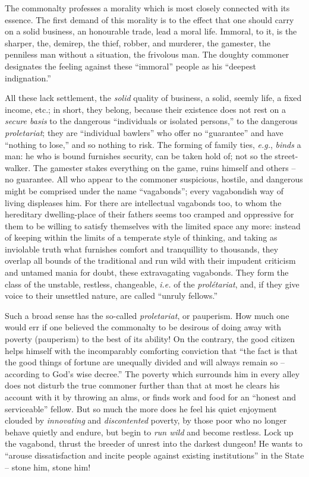 The commonalty professes a morality which is most closely connected with its 
essence. The first demand of this morality is to the effect that one should 
carry on a solid business, an honourable trade, lead a moral life. Immoral, to 
it, is the sharper, the, demirep, the thief, robber, and murderer, the 
gamester, the penniless man without a situation, the frivolous man. The 
doughty commoner designates the feeling against these ``immoral'' people as 
his ``deepest indignation.''

All these lack settlement, the \textit{solid} quality of business, a solid, 
seemly life, a fixed income, etc.; in short, they belong, because their 
existence does not rest on a \textit{secure basis} to the dangerous 
``individuals or isolated persons,'' to the dangerous \textit{proletariat}; 
they are ``individual bawlers'' who offer no ``guarantee'' and have 
``nothing to lose,'' and so nothing to risk. The forming of family ties, 
\textit{e.g.}, \textit{binds} a man: he who is bound furnishes security, can 
be taken hold of; not so the street-walker. The gamester stakes everything on 
the game, ruins himself and others -- no guarantee. All who appear to the 
commoner suspicious, hostile, and dangerous might be comprised under the name 
``vagabonds''; every vagabondish way of living displeases him. For there are 
intellectual vagabonds too, to whom the hereditary dwelling-place of their 
fathers seems too cramped and oppressive for them to be willing to satisfy 
themselves with the limited space any more: instead of keeping within the 
limits of a temperate style of thinking, and taking as inviolable truth what 
furnishes comfort and tranquillity to thousands, they overlap all bounds of 
the traditional and run wild with their impudent criticism and untamed mania 
for doubt, these extravagating vagabonds. They form the class of the unstable, 
restless, changeable, \textit{i.e.} of the \textit{prol\'etariat}, and, if 
they give voice to their unsettled nature, are called ``unruly fellows.''

Such a broad sense has the so-called \textit{proletariat}, or pauperism. How 
much one would err if one believed the commonalty to be desirous of doing away 
with poverty (pauperism) to the best of its ability! On the contrary, the good 
citizen helps himself with the incomparably comforting conviction that ``the 
fact is that the good things of fortune are unequally divided and will always 
remain so -- according to God's wise decree.'' The poverty which surrounds 
him in every alley does not disturb the true commoner further than that at 
most he clears his account with it by throwing an alms, or finds work and food 
for an ``honest and serviceable'' fellow. But so much the more does he feel 
his quiet enjoyment clouded by \textit{innovating} and \textit{discontented} 
poverty, by those poor who no longer behave quietly and endure, but begin to 
\textit{run wild} and become restless. Lock up the vagabond, thrust the 
breeder of unrest into the darkest dungeon! He wants to ``arouse 
dissatisfaction and incite people against existing institutions'' in the 
State -- stone him, stone him!

